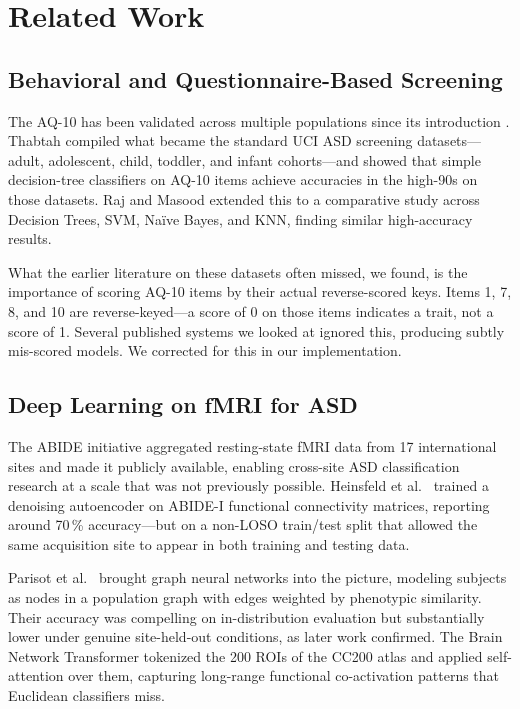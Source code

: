 \documentclass[conference]{IEEEtran}
\begin{document}
\section{Related Work}

\subsection{Behavioral and Questionnaire-Based Screening}

The AQ-10 has been validated across multiple populations since its
introduction \cite{allison2012}. Thabtah \cite{thabtah2019} compiled
what became the standard UCI ASD screening datasets---adult, adolescent,
child, toddler, and infant cohorts---and showed that simple decision-tree
classifiers on AQ-10 items achieve accuracies in the high-90s on those
datasets. Raj and Masood \cite{raj2020} extended this to a comparative
study across Decision Trees, SVM, Na{\"i}ve Bayes, and KNN, finding
similar high-accuracy results.

What the earlier literature on these datasets often missed, we found, is
the importance of scoring AQ-10 items by their actual reverse-scored
keys. Items 1, 7, 8, and 10 are reverse-keyed---a score of 0 on those
items indicates a trait, not a score of 1. Several published systems we
looked at ignored this, producing subtly mis-scored models. We corrected
for this in our implementation.

\subsection{Deep Learning on fMRI for ASD}

The ABIDE initiative \cite{di2014} aggregated resting-state fMRI data
from 17 international sites and made it publicly available, enabling
cross-site ASD classification research at a scale that was not previously
possible. Heinsfeld et al.\ \cite{heinsfeld2018} trained a denoising
autoencoder on ABIDE-I functional connectivity matrices, reporting
around 70\,\% accuracy---but on a non-LOSO train/test split that
allowed the same acquisition site to appear in both training and testing
data.

Parisot et al.\ \cite{parisot2018} brought graph neural networks into
the picture, modeling subjects as nodes in a population graph with edges
weighted by phenotypic similarity. Their accuracy was compelling on
in-distribution evaluation but substantially lower under genuine
site-held-out conditions, as later work confirmed. The Brain Network
Transformer \cite{kan2022bnt} tokenized the 200 ROIs of the CC200 atlas
and applied self-attention over them, capturing long-range functional
co-activation patterns that Euclidean classifiers miss.
\end{document}
